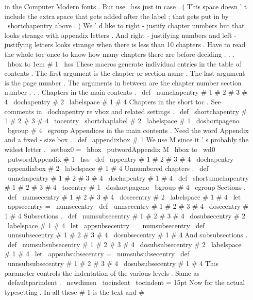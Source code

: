 {{in
the
Computer
Modern
fonts
.
%
But
use
\
hss
just
in
case
.
%
(
This
space
doesn
'
t
include
the
extra
space
that
gets
added
after
%
the
label
;
that
gets
put
in
by
\
shortchapentry
above
.
)
%
%
We
'
d
like
to
right
-
justify
chapter
numbers
but
that
looks
strange
%
with
appendix
letters
.
And
right
-
justifying
numbers
and
%
left
-
justifying
letters
looks
strange
when
there
is
less
than
10
%
chapters
.
Have
to
read
the
whole
toc
once
to
know
how
many
chapters
%
there
are
before
deciding
.
.
.
\
hbox
to
1em
{
#
1
\
hss
}
%
}
%
These
macros
generate
individual
entries
in
the
table
of
contents
.
%
The
first
argument
is
the
chapter
or
section
name
.
%
The
last
argument
is
the
page
number
.
%
The
arguments
in
between
are
the
chapter
number
section
number
.
.
.
%
Chapters
in
the
main
contents
.
\
def
\
numchapentry
#
1
#
2
#
3
#
4
{
\
dochapentry
{
#
2
\
labelspace
#
1
}
{
#
4
}
}
%
%
Chapters
in
the
short
toc
.
%
See
comments
in
\
dochapentry
re
vbox
and
related
settings
.
\
def
\
shortchapentry
#
1
#
2
#
3
#
4
{
%
\
tocentry
{
\
shortchaplabel
{
#
2
}
\
labelspace
#
1
}
{
\
doshortpageno
\
bgroup
#
4
\
egroup
}
%
}
%
Appendices
in
the
main
contents
.
%
Need
the
word
Appendix
and
a
fixed
-
size
box
.
%
\
def
\
appendixbox
#
1
{
%
%
We
use
M
since
it
'
s
probably
the
widest
letter
.
\
setbox0
=
\
hbox
{
\
putwordAppendix
{
}
M
}
%
\
hbox
to
\
wd0
{
\
putwordAppendix
{
}
#
1
\
hss
}
}
%
\
def
\
appentry
#
1
#
2
#
3
#
4
{
\
dochapentry
{
\
appendixbox
{
#
2
}
\
labelspace
#
1
}
{
#
4
}
}
%
Unnumbered
chapters
.
\
def
\
unnchapentry
#
1
#
2
#
3
#
4
{
\
dochapentry
{
#
1
}
{
#
4
}
}
\
def
\
shortunnchapentry
#
1
#
2
#
3
#
4
{
\
tocentry
{
#
1
}
{
\
doshortpageno
\
bgroup
#
4
\
egroup
}
}
%
Sections
.
\
def
\
numsecentry
#
1
#
2
#
3
#
4
{
\
dosecentry
{
#
2
\
labelspace
#
1
}
{
#
4
}
}
\
let
\
appsecentry
=
\
numsecentry
\
def
\
unnsecentry
#
1
#
2
#
3
#
4
{
\
dosecentry
{
#
1
}
{
#
4
}
}
%
Subsections
.
\
def
\
numsubsecentry
#
1
#
2
#
3
#
4
{
\
dosubsecentry
{
#
2
\
labelspace
#
1
}
{
#
4
}
}
\
let
\
appsubsecentry
=
\
numsubsecentry
\
def
\
unnsubsecentry
#
1
#
2
#
3
#
4
{
\
dosubsecentry
{
#
1
}
{
#
4
}
}
%
And
subsubsections
.
\
def
\
numsubsubsecentry
#
1
#
2
#
3
#
4
{
\
dosubsubsecentry
{
#
2
\
labelspace
#
1
}
{
#
4
}
}
\
let
\
appsubsubsecentry
=
\
numsubsubsecentry
\
def
\
unnsubsubsecentry
#
1
#
2
#
3
#
4
{
\
dosubsubsecentry
{
#
1
}
{
#
4
}
}
%
This
parameter
controls
the
indentation
of
the
various
levels
.
%
Same
as
\
defaultparindent
.
\
newdimen
\
tocindent
\
tocindent
=
15pt
%
Now
for
the
actual
typesetting
.
In
all
these
#
1
is
the
text
and
#
}
